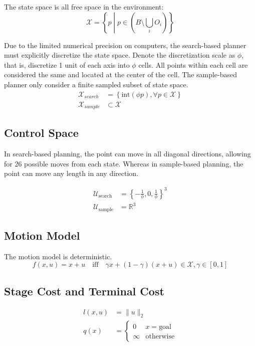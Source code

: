 \documentclass[conference]{IEEEtran}
\begin{document}
The state space is all free space in the environment:
\[
\mathcal{X} = \left\{ p \middle| p \in \left( B \setminus \bigcup_i O_i \right) \right\}
\]

Due to the limited numerical precision on computers, 
the search-based planner must explicitly discretize the state space. 
Denote the discretization scale as $\phi$, that is, discretize 1 unit of each axis into $\phi$ cells.
All points within each cell are considered the same and located at the center of the cell.
The sample-based planner only consider a finite sampled subset of state space.
$$
\begin{aligned}
    \mathcal{X}_{search} &= \left\{ \text{int}(\phi p), \forall p \in \mathcal{X} \right\} \\
    \mathcal{X}_{sample} &\subset \mathcal{X}
\end{aligned}
$$

\subsection{Control Space}
In search-based planning, 
the point can move in all diagonal directions, 
allowing for 26 possible moves from each state. 
Whereas in sample-based planning, the point can move any length in any direction.

\[
\begin{aligned}
    \mathcal{U}_{\text{search}} &= \left\{ -\frac{1}{\phi}, 0, \frac{1}{\phi} \right\}^{3} \\ 
    \mathcal{U}_{\text{sample}} &= \mathbb{R}^{3}
\end{aligned}
\]

\subsection{Motion Model}
The motion model is deterministic.
\[
f(x, u) = x + u \quad \text{iff} \quad \gamma x + (1-\gamma)(x + u) \in \mathcal{X}, \gamma \in [0,1]
\]

\subsection{Stage Cost and Terminal Cost}
\[
\begin{aligned}
    l(x, u) &= \| u \|_{2} \\
    q(x) &= \begin{cases} 
        0 & x = \text{goal} \\ 
        \infty & \text{otherwise}
    \end{cases}
\end{aligned}
\]
\end{document}
